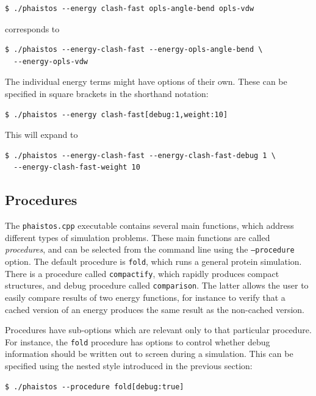 \documentclass[11pt,a4paper,twoside]{book}
\begin{document}
\begin{verbatim}
$ ./phaistos --energy clash-fast opls-angle-bend opls-vdw
\end{verbatim}

\noindent
corresponds to

\begin{verbatim}
$ ./phaistos --energy-clash-fast --energy-opls-angle-bend \ 
  --energy-opls-vdw
\end{verbatim}

\noindent The individual energy terms might have options of their
own. These can be specified in square brackets in the shorthand
notation:

\begin{verbatim}
$ ./phaistos --energy clash-fast[debug:1,weight:10]
\end{verbatim}

\noindent
This will expand to

\begin{verbatim}
$ ./phaistos --energy-clash-fast --energy-clash-fast-debug 1 \ 
  --energy-clash-fast-weight 10
\end{verbatim}

\subsection{Procedures}
\label{sec:procedures}

The \texttt{phaistos.cpp} executable contains several main functions,
which address different types of simulation problems. These main
functions are called \emph{procedures}, and can be selected from the
command line using the \texttt{--procedure} option. The default
procedure is \texttt{fold}, which runs a general protein
simulation. There is a procedure called \texttt{compactify}, which
rapidly produces compact structures, and debug procedure called
\texttt{comparison}. The latter allows the user to easily compare results
of two energy functions, for instance to verify that a cached version
of an energy produces the same result as the non-cached version.

Procedures have sub-options which are relevant only to that particular
procedure. For instance, the \texttt{fold} procedure has options to
control whether debug information should be written out to screen
during a simulation. This can be specified using the
nested style introduced in the previous section:

\begin{verbatim}
$ ./phaistos --procedure fold[debug:true]
\end{verbatim}
\end{document}
